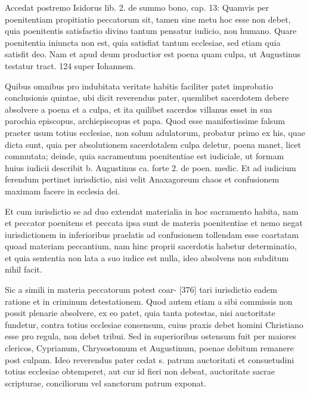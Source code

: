Accedat postremo Isidorus lib. 2. de summo bono, cap. 13: Quamvis per poenitentiam propitiatio peccatorum sit, tamen sine metu hoc esse non debet, quia poenitentis satisfactio divino tantum pensatur iudicio, non humano. Quare poenitentia iniuncta non est, quia satisfiat tantum ecclesiae, sed etiam quia satisfit deo. Nam et apud deum productior est poena quam culpa, ut Augustinus testatur tract. 124 super Iohannem.

Quibus omnibus pro indubitata veritate habitis faciliter patet improbatio conclusionis quintae, ubi dicit reverendus pater, quemlibet sacerdotem debere absolvere a poena et a culpa, et ita quilibet sacerdos villanus esset in sua parochia episcopus, archiepiscopus et papa. Quod esse manifestissime falsum praeter usum totius ecclesiae, non solum adulatorum, probatur primo ex his, quae dicta sunt, quia per absolutionem sacerdotalem culpa deletur, poena manet, licet commutata; deinde, quia sacramentum poenitentiae est iudiciale, ut formam huius iudicii describit b. Augustinus ca. forte 2. de poen. medic. Et ad iudicium ferendum pertinet iurisdictio, nisi velit Anaxagoreum chaos et confusionem maximam facere in ecclesia dei.

Et cum iurisdictio se ad duo extendat materialia in hoc sacramento habita, nam et peccator poenitens et peccata ipsa sunt de materia poenitentiae et nemo negat iurisdictionem in inferioribus praelatis ad confusionem tollendam esse coartatam quoad materiam peccantium, nam hinc proprii sacerdotis habetur determinatio, et quia sententia non lata a suo iudice est nulla, ideo absolvens non subditum nihil facit.

Sic a simili in materia peccatorum potest coar- [376] tari iurisdictio eadem ratione et in criminum detestationem. Quod autem etiam a sibi commissis non possit plenarie absolvere, ex eo patet, quia tanta potestas, nisi auctoritate fundetur, contra totius ecclesiae consensum, cuius praxis debet homini Christiano esse pro regula, non debet tribui. Sed in superioribus ostensum fuit per maiores clericos, Cyprianum, Chrysostomum et Augustinum, poenae debitum remanere post culpam. Ideo reverendus pater cedat s. patrum auctoritati et consuetudini totius ecclesiae obtemperet, aut cur id fieri non debeat, auctoritate sacrae scripturae, conciliorum vel sanctorum patrum exponat.

